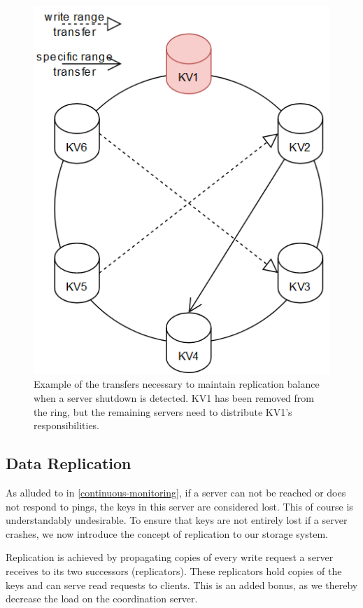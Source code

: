 \documentclass[sigconf]{acmart}
\begin{document}
\begin{center}
  \begin{figure}[htbp]
    \centerline{\includegraphics[scale=0.4]{attachments/shutdown_transfer.png}}
    \caption{Example of the transfers necessary to maintain replication balance when a server shutdown is detected. KV1 has been removed from the ring, but the remaining servers need to distribute KV1's responsibilities.}
    \label{fig02}
  \end{figure}
\end{center}


\subsection{Data Replication}
As alluded to in \ref{continuous-monitoring}, if a server can not be reached or does not respond to pings, the keys in this server are considered lost. This of course is understandably undesirable. To ensure that keys are not entirely lost if a server crashes, we now introduce the concept of replication to our storage system.

Replication is achieved by propagating copies of every write request a server receives to its two successors (replicators). These replicators hold copies of the keys and can serve read requests to clients. This is an added bonus, as we thereby decrease the load on the coordination server.
\end{document}
